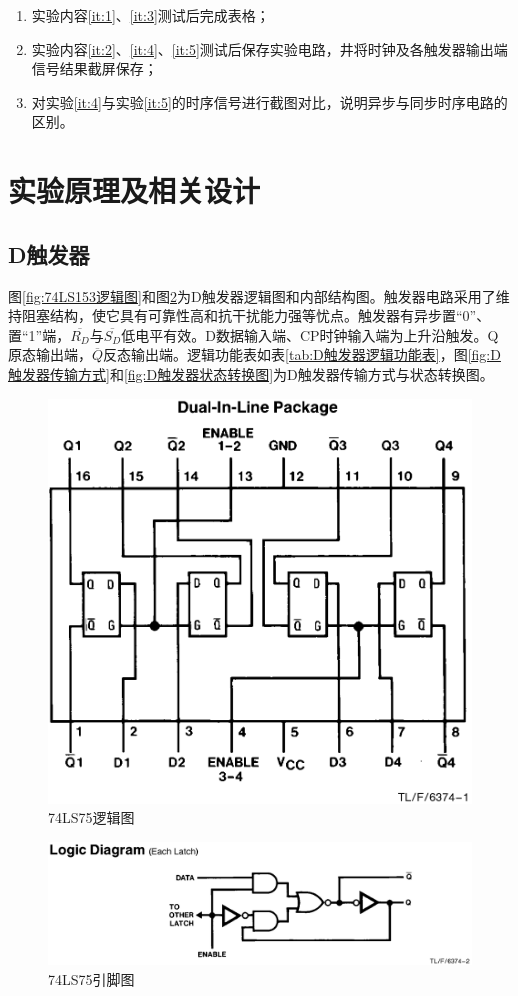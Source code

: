 \documentclass{ctexrep}
\begin{document}
\begin{enumerate}
	\item 实验内容\ref{it:1}、\ref{it:3}测试后完成表格；
	\item 实验内容\ref{it:2}、\ref{it:4}、\ref{it:5}测试后保存实验电路，井将时钟及各触发器输出端信号结果截屏保存；
	\item 对实验\ref{it:4}与实验\ref{it:5}的时序信号进行截图对比，说明异步与同步时序电路的区别。
\end{enumerate}

\section{实验原理及相关设计}%
\label{sec:实验原理及相关设计\arabic{chapter}}

\subsection{D触发器}%
\label{sub:D触发器}

图\ref{fig:74LS153逻辑图}和图\ref{fig:74LS75引脚图}为D触发器逻辑图和内部结构图。触发器电路采用了维持阻塞结构，使它具有可靠性高和抗干扰能力强等忧点。触发器有异步置“0”、置“1”端，$\overline{R_D}$与$\overline{S_D}$低电平有效。D数据输入端、CP时钟输入端为上升沿触发。Q原态输出端，$\overline{Q}$反态输出端。逻辑功能表如表\ref{tab:D触发器逻辑功能表}，图\ref{fig:D触发器传输方式}和\ref{fig:D触发器状态转换图}为D触发器传输方式与状态转换图。

\begin{figure}[htbp]
	\centering
	\includegraphics[width=.5\linewidth]{74LS75001.png}
	\caption{74LS75逻辑图}
	\label{fig:74LS75逻辑图}
\end{figure}

\begin{figure}[htbp]
	\centering
	\includegraphics[width=.8\linewidth]{74LS75002.png}
	\caption{74LS75引脚图}
	\label{fig:74LS75引脚图}
\end{figure}
\end{document}
